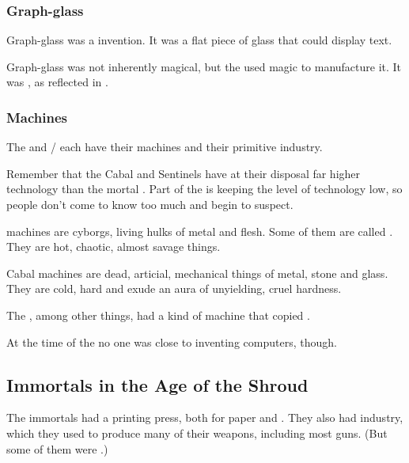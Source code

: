 \subsubsection{Graph-glass}
Graph-glass was a \resphan{} invention. 
It was a flat piece of glass that could display text. 

Graph-glass was not inherently magical, but the \resphain used magic to manufacture it.
It was , as \Teshrial reflected in \TwilightAngelRememberEmph.





\subsubsection{Machines}
The \dragons{} and \banes/\resphain{} each have their machines and their primitive industry. 

Remember that the Cabal and Sentinels have at their disposal far higher technology than the mortal \Miithians. 
Part of the \charade{} is keeping the level of technology low, so people don't come to know too much and begin to suspect.

\Draconic{} machines are cyborgs, living hulks of metal and flesh. 
Some of them are called \colossi. They are hot, chaotic, almost savage things. 

Cabal machines are dead, articial, mechanical things of metal, stone and glass. They are cold, hard and exude an aura of unyielding, cruel hardness. 

The \resphain, among other things, had a kind of machine that copied . 

At the time of the \thirdbanewar{} no one was close to inventing computers, though. 









\subsection{Immortals in the {Age of the Shroud}}
The immortals had a printing press, both for paper and .
They also had industry, which they used to produce many of their weapons, including most guns. 
(But some of them were .)

